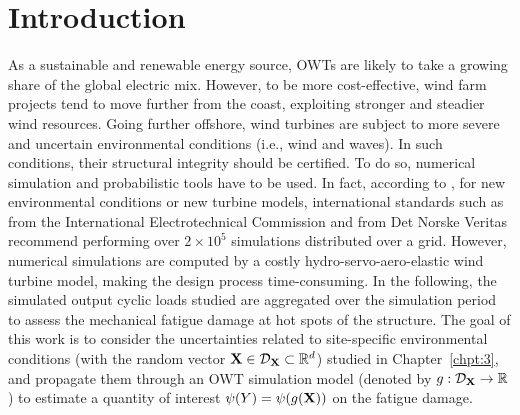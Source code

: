 \section{Introduction}
As a sustainable and renewable energy source, OWTs are likely to take a growing share of the global electric mix. 
However, to be more cost-effective, wind farm projects tend to move further from the coast, exploiting stronger and steadier wind resources. 
Going further offshore, wind turbines are subject to more severe and uncertain environmental conditions (i.e., wind and waves). 
In such conditions, their structural integrity should be certified. 
To do so, numerical simulation and probabilistic tools have to be used. 
In fact, according to \citet{graf_2016}, for new environmental conditions or new turbine models, international standards such as \citet{iec_2019} from the International Electrotechnical Commission and \citet{dnv_loads_2016} from Det Norske Veritas recommend performing over $2 \times 10^5$ simulations distributed over a grid. 
However, numerical simulations are computed by a costly hydro-servo-aero-elastic wind turbine model, making the design process time-consuming. 
In the following, the simulated output cyclic loads studied are aggregated over the simulation period to assess the mechanical fatigue damage at hot spots of the structure. 
The goal of this work is to consider the uncertainties related to site-specific environmental conditions (with the random vector ${\bf X} \in \mathcal{D}_{{\bf X}} \subset \mathbb{R}^d$) studied in Chapter~\ref{chpt:3}, 
and propagate them through an OWT simulation model (denoted by $g: \mathcal{D}_{{\bf X}}\rightarrow \mathbb{R}$) to estimate a quantity of interest $\psi(Y) = \psi(g({\bf X}))$ on the fatigue damage. 

